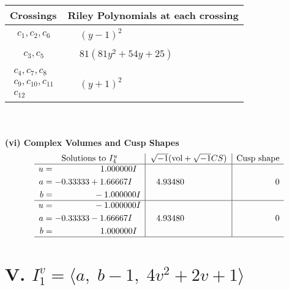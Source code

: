 \documentclass[1p]{elsarticle_modified}
\theoremstyle{definition}
\newcommand{\I}{\sqrt{-1}}
\begin{document}
\begin{tabular}{m{50pt}|m{274pt}}
Crossings & \hspace{64pt}Riley Polynomials at each crossing \\
\hline $$\begin{aligned}c_{1},c_{2},c_{6}\end{aligned}$$&$\begin{aligned}
&(y-1)^2
\end{aligned}$\\
\hline $$\begin{aligned}c_{3},c_{5}\end{aligned}$$&$\begin{aligned}
&81(81 y^2+54 y+25)
\end{aligned}$\\
\hline $$\begin{aligned}c_{4},c_{7},c_{8}\\c_{9},c_{10},c_{11}\\c_{12}\end{aligned}$$&$\begin{aligned}
&(y+1)^2
\end{aligned}$\\
\hline
\end{tabular}\\~\\
\newpage\flushleft \textbf{(vi) Complex Volumes and Cusp Shapes}
$$\begin{array}{c|c|c}  
\text{Solutions to }I^u_{4}& \I (\text{vol} + \sqrt{-1}CS) & \text{Cusp shape}\\
 \hline 
\begin{aligned}
u &= \phantom{-0.000000 -}1.000000 I \\
a &= -0.33333 + 1.66667 I \\
b &= \phantom{-0.000000 } -1.000000 I\end{aligned}
 & \phantom{-}4.93480\phantom{ +0.000000I} & \phantom{-0.000000 } 0 \\ \hline\begin{aligned}
u &= \phantom{-0.000000 } -1.000000 I \\
a &= -0.33333 - 1.66667 I \\
b &= \phantom{-0.000000 -}1.000000 I\end{aligned}
 & \phantom{-}4.93480\phantom{ +0.000000I} & \phantom{-0.000000 } 0\\
 \hline 
 \end{array}$$\newpage\newpage\renewcommand{\arraystretch}{1}
\centering \section*{V. $I^v_{1}= \langle a,\;b-1,\;4 v^2+2 v+1 \rangle$}
\end{document}
